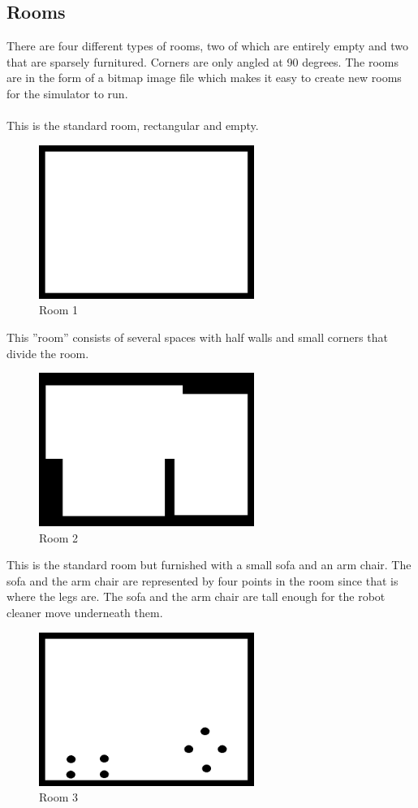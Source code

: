 \documentclass[bachelor]{kththesis}
\begin{document}
\subsection{Rooms}
There are four different types of rooms, two of which are entirely empty and two that are sparsely furnitured. Corners are only angled at 90 degrees.
The rooms are in the form of a bitmap image file which makes it easy to create new rooms for the 
simulator to run.
\\\\
This is the standard room, rectangular and empty.
\begin{figure}[H]
	\includegraphics[width=7cm]{img/room.png}
	\centering
	\caption{Room 1}
\end{figure}
This ''room'' consists of several spaces with half walls and small corners that divide the room.
\begin{figure}[H]
	\includegraphics[width=7cm]{img/room2.png}
	\centering
	\caption{Room 2}
\end{figure}
This is the standard room but furnished with a small sofa and an arm chair.
The sofa and the arm chair are represented by four points in the room since that is where the legs are. The sofa and the arm chair are tall enough for the robot cleaner move underneath them. 
\begin{figure}[H]
	\includegraphics[width=7cm]{img/roomfurn.png}
	\centering
	\caption{Room 3}
\end{figure}
\end{document}
